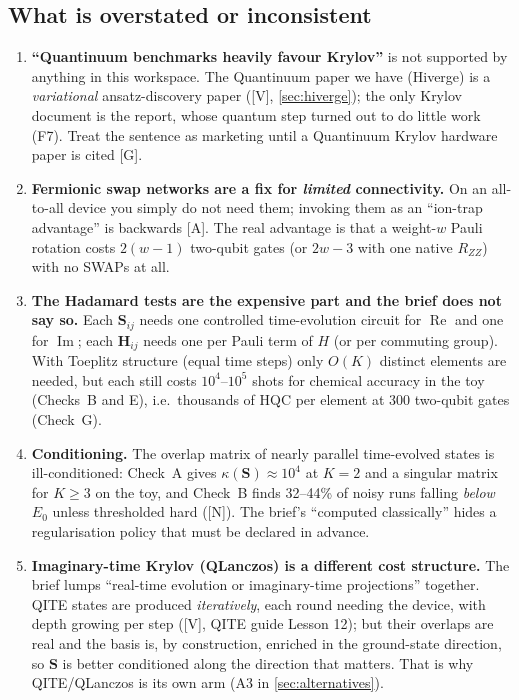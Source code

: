 \documentclass[11pt,a4paper]{article}
\newcommand{\report}{the report}
\newcommand{\lV}{\textcolor{keyblue}{[V]}}   %
\newcommand{\lA}{\textcolor{notegray}{[A]}}  %
\newcommand{\lG}{\textcolor{alertred}{[G]}}  %
\newcommand{\lN}{\textcolor{keyblue}{[N]}}   %
\begin{document}
\subsection{What is overstated or inconsistent}
\begin{enumerate}
\item \textbf{``Quantinuum benchmarks heavily favour Krylov''} is not supported by anything in this workspace. The Quantinuum paper we have (Hiverge) is a \emph{variational} ansatz-discovery paper (\lV, \cref{sec:hiverge}); the only Krylov document is \report, whose quantum step turned out to do little work (F7). Treat the sentence as marketing until a Quantinuum Krylov hardware paper is cited \lG.
\item \textbf{Fermionic swap networks are a fix for \emph{limited} connectivity.} On an all-to-all device you simply do not need them; invoking them as an ``ion-trap advantage'' is backwards \lA. The real advantage is that a weight-$w$ Pauli rotation costs $2(w-1)$ two-qubit gates (or $2w-3$ with one native $R_{ZZ}$) with no SWAPs at all.
\item \textbf{The Hadamard tests are the expensive part and the brief does not say so.} Each $\mathbf S_{ij}$ needs one controlled time-evolution circuit for $\operatorname{Re}$ and one for $\operatorname{Im}$; each $\mathbf H_{ij}$ needs one per Pauli term of $H$ (or per commuting group). With Toeplitz structure (equal time steps) only $O(K)$ distinct elements are needed, but each still costs $10^4$--$10^5$ shots for chemical accuracy in the toy (Checks~B and E), i.e.\ thousands of HQC per element at 300 two-qubit gates (Check~G).
\item \textbf{Conditioning.} The overlap matrix of nearly parallel time-evolved states is ill-conditioned: Check~A gives $\kappa(\mathbf S)\approx10^4$ at $K=2$ and a singular matrix for $K\ge3$ on the toy, and Check~B finds 32--44\% of noisy runs falling \emph{below} $E_0$ unless thresholded hard (\lN). The brief's ``computed classically'' hides a regularisation policy that must be declared in advance.
\item \textbf{Imaginary-time Krylov (QLanczos) is a different cost structure.} The brief lumps ``real-time evolution or imaginary-time projections'' together. QITE states are produced \emph{iteratively}, each round needing the device, with depth growing per step (\lV, QITE guide Lesson 12); but their overlaps are real and the basis is, by construction, enriched in the ground-state direction, so $\mathbf S$ is better conditioned along the direction that matters. That is why QITE/QLanczos is its own arm (A3 in \cref{sec:alternatives}).
\end{enumerate}
\end{document}
